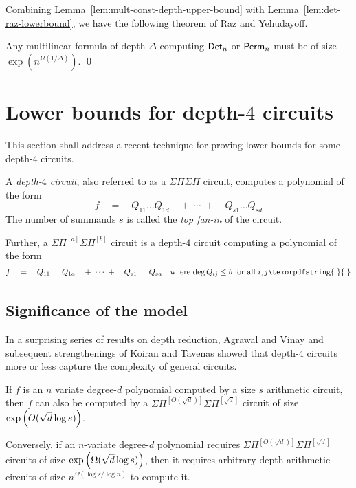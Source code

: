 \documentclass{birkjour}
\newcommand{\spaced}[1]{\quad#1\quad}
\newcommand{\SPSP}{\Sigma\Pi\Sigma\Pi}
\newcommand{\mySPSP}[2]{\Sigma\Pi^{[#1]}\Sigma\Pi^{[#2]}}
\providecommand{\DIFaddtex}[1]{{\protect\color{blue}\uwave{#1}}} %
\providecommand{\DIFaddbegin}{} %
\providecommand{\DIFaddend}{} %
\providecommand{\DIFadd}[1]{\texorpdfstring{\DIFaddtex{#1}}{#1}} %
\begin{document}
Combining Lemma~\ref{lem:mult-const-depth-upper-bound} with Lemma~\ref{lem:det-raz-lowerbound}, we have the following theorem of Raz and Yehudayoff. 

\begin{theorem}
Any multilinear formula of depth $\Delta$ computing $\mathsf{Det}_n$ or $\mathsf{Perm}_n$ must be of size $\exp(n^{\Omega(1/\Delta)})$.  \qed
\end{theorem}






\section{Lower bounds for depth-$4$ circuits}

This section shall address a recent technique for proving lower bounds for some depth-$4$ circuits. 

\begin{definition}
  A \emph{depth-$4$ circuit}, also referred to as a $\SPSP$ circuit, computes a polynomial of the form 
  $$
  f \spaced{=} Q_{11}\dots Q_{1d} \spaced{+\;\cdots\;+}  Q_{s1}\dots Q_{sd}
  $$
  The number of summands $s$ is called the \emph{top fan-in} of the circuit. 

  Further, a $\mySPSP{a}{b}$ circuit is a depth-$4$ circuit computing a polynomial of the form
  $$
  f \spaced{=} Q_{11}\dots Q_{1a} \spaced{+\;\cdots\;+}  Q_{s1}\dots Q_{sa}\quad\text{where $\deg Q_{ij} \leq b$ for all $i,j$}\DIFaddbegin \DIFadd{.
  }\DIFaddend $$
\end{definition}

\subsection{Significance of the model}

In a surprising series of results on depth reduction, Agrawal and Vinay \cite{av08} and subsequent strengthenings of Koiran \cite{koiran} and Tavenas \cite{Tav13} showed that depth-$4$ circuits more or less capture the complexity of general circuits. 

\begin{theorem} 
  If $f$ is an $n$ variate degree-$d$ polynomial computed by a size $s$ arithmetic circuit, then $f$ can also be computed by a $\mySPSP{O(\sqrt{d})}{\sqrt{d}}$ circuit of size $\exp\left(O(\sqrt{d}\log s)\right)$. 

  Conversely, if an $n$-variate degree-$d$ polynomial requires $\mySPSP{O(\sqrt{d})}{\sqrt{d}}$  circuits of size $\exp\left(\Omega(\sqrt{d}\log s)\right)$, then it requires arbitrary depth arithmetic circuits of size $n^{\Omega(\log s / \log n)}$ to compute it. 
\end{theorem}
\end{document}
